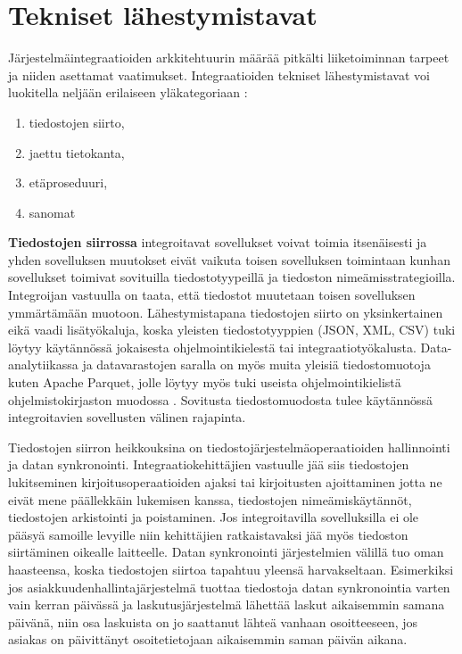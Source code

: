 \section{Tekniset lähestymistavat} \label{Tekniset lähestymistavat}

Järjestelmäintegraatioiden arkkitehtuurin määrää pitkälti liiketoiminnan tarpeet ja niiden asettamat vaatimukset. Integraatioiden tekniset lähestymistavat voi luokitella neljään erilaiseen yläkategoriaan \citep[sivu~64]{Hohpe2004}:

\begin{enumerate}
   \item tiedostojen siirto,
   \item jaettu tietokanta,
   \item etäproseduuri,
   \item sanomat
   
\end{enumerate}

\textbf{Tiedostojen siirrossa} integroitavat sovellukset voivat toimia itsenäisesti ja yhden sovelluksen muutokset eivät vaikuta toisen sovelluksen toimintaan kunhan sovellukset toimivat sovituilla tiedostotyypeillä ja tiedoston nimeämisstrategioilla. Integroijan vastuulla on taata, että tiedostot muutetaan toisen sovelluksen ymmärtämään muotoon. Lähestymistapana tiedostojen siirto on yksinkertainen eikä vaadi lisätyökaluja, koska yleisten tiedostotyyppien (JSON, XML, CSV) tuki löytyy käytännössä jokaisesta ohjelmointikielestä tai integraatiotyökalusta.
Data-analytiikassa ja datavarastojen saralla on myös muita yleisiä tiedostomuotoja kuten Apache Parquet, jolle löytyy myös tuki useista ohjelmointikielistä ohjelmistokirjaston muodossa \citep{Parquet}.
Sovitusta tiedostomuodosta tulee käytännössä integroitavien sovellusten välinen rajapinta.

Tiedostojen siirron heikkouksina on tiedostojärjestelmäoperaatioiden hallinnointi ja datan synkronointi.
Integraatiokehittäjien vastuulle jää siis tiedostojen lukitseminen kirjoitusoperaatioiden ajaksi tai kirjoitusten ajoittaminen jotta ne eivät mene päällekkäin lukemisen kanssa, tiedostojen nimeämiskäytännöt, tiedostojen arkistointi ja poistaminen. Jos integroitavilla sovelluksilla ei ole pääsyä samoille levyille niin kehittäjien ratkaistavaksi jää myös tiedoston siirtäminen oikealle laitteelle.
Datan synkronointi järjestelmien välillä tuo oman haasteensa, koska tiedostojen siirtoa tapahtuu yleensä harvakseltaan. Esimerkiksi jos asiakkuudenhallintajärjestelmä tuottaa tiedostoja datan synkronointia varten vain kerran päivässä ja laskutusjärjestelmä lähettää laskut aikaisemmin samana päivänä, niin osa laskuista on jo saattanut lähteä vanhaan osoitteeseen, jos asiakas on päivittänyt osoitetietojaan aikaisemmin saman päivän aikana.


